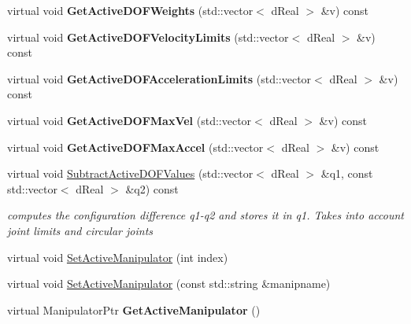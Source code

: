 \begin{DoxyCompactItemize}
\item 
\hypertarget{classOpenRAVE_1_1RobotBase_ad4d3771c5eb2f888d99c56e9a56cf2fe}{
virtual void {\bfseries GetActiveDOFWeights} (std::vector$<$ dReal $>$ \&v) const }
\label{classOpenRAVE_1_1RobotBase_ad4d3771c5eb2f888d99c56e9a56cf2fe}

\item 
\hypertarget{classOpenRAVE_1_1RobotBase_a8af7cfd13ee38f54b023141ecc09f598}{
virtual void {\bfseries GetActiveDOFVelocityLimits} (std::vector$<$ dReal $>$ \&v) const }
\label{classOpenRAVE_1_1RobotBase_a8af7cfd13ee38f54b023141ecc09f598}

\item 
\hypertarget{classOpenRAVE_1_1RobotBase_a430512c9498310ee59516bad6735d300}{
virtual void {\bfseries GetActiveDOFAccelerationLimits} (std::vector$<$ dReal $>$ \&v) const }
\label{classOpenRAVE_1_1RobotBase_a430512c9498310ee59516bad6735d300}

\item 
\hypertarget{classOpenRAVE_1_1RobotBase_a0f6e2659ed68f68330cfae433ea46f11}{
virtual void {\bfseries GetActiveDOFMaxVel} (std::vector$<$ dReal $>$ \&v) const }
\label{classOpenRAVE_1_1RobotBase_a0f6e2659ed68f68330cfae433ea46f11}

\item 
\hypertarget{classOpenRAVE_1_1RobotBase_ad9283ddebe5ce968918aeeb513248382}{
virtual void {\bfseries GetActiveDOFMaxAccel} (std::vector$<$ dReal $>$ \&v) const }
\label{classOpenRAVE_1_1RobotBase_ad9283ddebe5ce968918aeeb513248382}

\item 
\hypertarget{classOpenRAVE_1_1RobotBase_a13c032494357fa0f2333e73d47322020}{
virtual void \hyperlink{classOpenRAVE_1_1RobotBase_a13c032494357fa0f2333e73d47322020}{SubtractActiveDOFValues} (std::vector$<$ dReal $>$ \&q1, const std::vector$<$ dReal $>$ \&q2) const }
\label{classOpenRAVE_1_1RobotBase_a13c032494357fa0f2333e73d47322020}

\begin{DoxyCompactList}\small\item\em computes the configuration difference q1-\/q2 and stores it in q1. Takes into account joint limits and circular joints \item\end{DoxyCompactList}\item 
virtual void \hyperlink{classOpenRAVE_1_1RobotBase_aff994b4316d3a31304ee13227e72322b}{SetActiveManipulator} (int index)
\item 
virtual void \hyperlink{classOpenRAVE_1_1RobotBase_a479c1b360a34fdc516369e1c3dbb3dc5}{SetActiveManipulator} (const std::string \&manipname)
\item 
\hypertarget{classOpenRAVE_1_1RobotBase_af5782c8413c068ddc9f471a8e4f48a3c}{
virtual ManipulatorPtr {\bfseries GetActiveManipulator} ()}
\label{classOpenRAVE_1_1RobotBase_af5782c8413c068ddc9f471a8e4f48a3c}


\end{DoxyCompactItemize}
